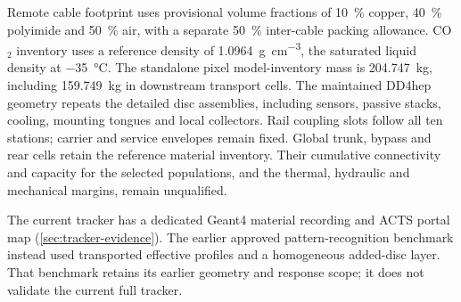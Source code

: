 Remote cable footprint uses provisional volume fractions of
\qty{10}{\percent} copper, \qty{40}{\percent} polyimide and
\qty{50}{\percent} air, with a separate \qty{50}{\percent} inter-cable
packing allowance. CO$_2$ inventory uses a reference density of
\qty{1.0964}{\gram\per\centi\metre\cubed}, the saturated liquid density
at \qty{-35}{\degreeCelsius}.\cite{nistco2} The standalone pixel model-inventory mass is
\qty{204.747}{\kilogram}, including \qty{159.749}{\kilogram} in downstream
transport cells. The maintained DD4hep geometry repeats the detailed disc assemblies, including
sensors, passive stacks, cooling, mounting tongues and local collectors. Rail
coupling slots follow all ten stations; carrier and service envelopes remain
fixed. Global trunk, bypass and rear cells retain the reference material
inventory. Their cumulative connectivity and capacity for the selected
populations, and the thermal, hydraulic and mechanical margins, remain
unqualified.

The current tracker has a dedicated Geant4 material recording and ACTS portal
map (\cref{sec:tracker-evidence}). The earlier approved pattern-recognition
benchmark instead used transported effective profiles and a homogeneous
added-disc layer. That benchmark retains its earlier geometry and response
scope; it does not validate the current full tracker.

\clearpage

